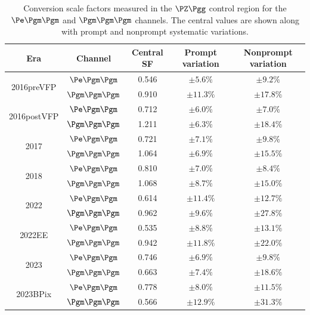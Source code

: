 \begin{table}[htbp]
  \centering
  \begin{tabular}{ccccc}
    \hline
    Era & Channel & Central SF & Prompt variation & Nonprompt variation \\
    \hline
    \multirow{2}{*}{2016preVFP} & $\Pe\Pgm\Pgm$ & 0.546 & $\pm 5.6\%$ & $\pm 9.2\%$ \\
                                & $\Pgm\Pgm\Pgm$ & 0.910 & $\pm 11.3\%$ & $\pm 17.8\%$ \\
    \hline
    \multirow{2}{*}{2016postVFP} & $\Pe\Pgm\Pgm$ & 0.712 & $\pm 6.0\%$ & $\pm 7.0\%$ \\
                                 & $\Pgm\Pgm\Pgm$ & 1.211 & $\pm 6.3\%$ & $\pm 18.4\%$ \\
    \hline
    \multirow{2}{*}{2017} & $\Pe\Pgm\Pgm$ & 0.721 & $\pm 7.1\%$ & $\pm 9.8\%$ \\
                          & $\Pgm\Pgm\Pgm$ & 1.064 & $\pm 6.9\%$ & $\pm 15.5\%$ \\
    \hline
    \multirow{2}{*}{2018} & $\Pe\Pgm\Pgm$ & 0.810 & $\pm 7.0\%$ & $\pm 8.4\%$ \\
                          & $\Pgm\Pgm\Pgm$ & 1.068 & $\pm 8.7\%$ & $\pm 15.0\%$ \\
    \hline
    \multirow{2}{*}{2022} & $\Pe\Pgm\Pgm$ & 0.614 & $\pm 11.4\%$ & $\pm 12.7\%$ \\
                          & $\Pgm\Pgm\Pgm$ & 0.962 & $\pm 9.6\%$ & $\pm 27.8\%$ \\
    \hline
    \multirow{2}{*}{2022EE} & $\Pe\Pgm\Pgm$ & 0.535 & $\pm 8.8\%$ & $\pm 13.1\%$ \\
                            & $\Pgm\Pgm\Pgm$ & 0.942 & $\pm 11.8\%$ & $\pm 22.0\%$ \\
    \hline
    \multirow{2}{*}{2023} & $\Pe\Pgm\Pgm$ & 0.746 & $\pm 6.9\%$ & $\pm 9.8\%$ \\
                          & $\Pgm\Pgm\Pgm$ & 0.663 & $\pm 7.4\%$ & $\pm 18.6\%$ \\
    \hline
    \multirow{2}{*}{2023BPix} & $\Pe\Pgm\Pgm$ & 0.778 & $\pm 8.0\%$ & $\pm 11.5\%$ \\
                              & $\Pgm\Pgm\Pgm$ & 0.566 & $\pm 12.9\%$ & $\pm 31.3\%$ \\
    \hline
  \end{tabular}
  \caption{Conversion scale factors measured in the $\PZ\Pgg$ control region for the $\Pe\Pgm\Pgm$ and $\Pgm\Pgm\Pgm$ channels. The central values are shown along with prompt and nonprompt systematic variations.}
  \label{tab:conv_sf}
\end{table}

